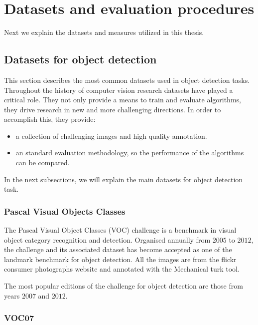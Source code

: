 \documentclass[12pt, a4paper, titlepage,twoside,openright]{article}
\begin{document}
\section{Datasets and evaluation procedures}

Next we explain the datasets and measures utilized in this thesis.

\subsection{Datasets for object detection}

This section describes the most common datasets used in object detection tasks. Throughout the history of computer vision research datasets have played a critical role.  They not only provide a means to train and evaluate algorithms, they drive research in new and more challenging directions. In order to accomplish this, they provide:


\begin{itemize}

\item a collection of challenging images and high quality annotation.

\item an standard evaluation methodology, so the performance of the algorithms can be compared. 


\end{itemize}



In the next subsections, we will explain the main datasets for object detection task.


\subsubsection{Pascal Visual Objects Classes}

The Pascal Visual Object Classes (VOC) challenge  \cite{voc07} is a benchmark in visual object category recognition and detection. Organised annually from $2005$ to $2012$, the challenge and its associated dataset has become accepted as one of the landmark benchmark for object detection. All the images are from the flickr consumer photographs website and annotated with the Mechanical turk tool.

The most popular editions of the challenge for object detection are those from years $2007$ and $2012$.

\subsubsection{VOC07}
\end{document}
